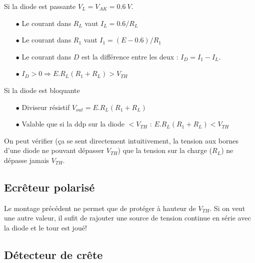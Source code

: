 		Si la diode est passante $V_L=V_{AK}=0.6\ V$.
		\begin{itemize}
		\item[$\bullet$] Le courant dans $R_L$ vaut $I_L = 0.6/R_L$
		\item[$\bullet$] Le courant dans $R_1$ vaut $I_1 = (E-0.6)/R_1$		
		\item[$\bullet$] Le courant dans $D$ est la différence entre les deux : $I_D 
		= I_1-I_L$.
		\item[$\bullet$] $I_D > 0 \Rightarrow E.R_L(R_1+R_L)>V_{TH}$
		\end{itemize}
		Si la diode est bloquante 
		\begin{itemize}
		\item[$\bullet$] Diviseur résistif  $V_{out} = E.R_L(R_1+R_L)$
		\item[$\bullet$] Valable que si la ddp sur la diode $<V_{TH}$ : 
		$E.R_L(R_1+R_L)<V_{TH}$
		\end{itemize}				
		On peut vérifier (ça se sent directement intuitivement, la tension aux bornes 
		d'une diode ne pouvant dépasser $V_{TH}$) que la tension sur 
		la charge ($R_L$) ne dépasse jamais $V_{TH}$.
		
		
		\subsection{Ecrêteur polarisé}
		Le montage précédent ne permet que de protéger à hauteur de $V_{TH}$. Si 
		on veut une autre valeur, il sufit de rajouter une source de tension continue 
		en série avec la diode et le tour est joué!
			
		
		\subsection{Détecteur de crête}
			
			
			
			
			
			
			
			
			
			
			
			
			
			
			
			
			
			
			
			
